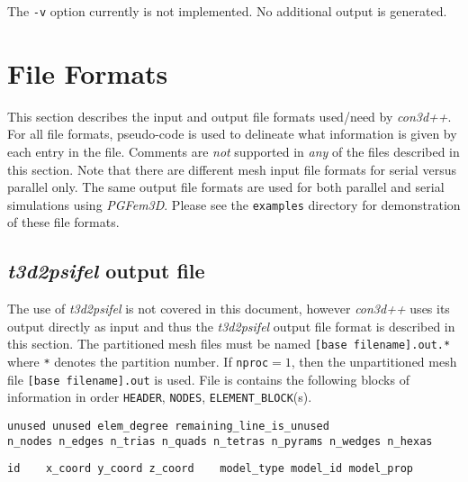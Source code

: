 \documentclass[]{article}
\def\pgf{\emph{PGFem3D}}
\def\con{\emph{con3d++}}
\def\gap{\vspace*{5mm}}
\begin{document}
The \verb=-v= option currently is not implemented. No additional
output is generated.

\section{File Formats}\label{sec:format}
This section describes the input and output file formats used/need by
\con{}. For all file formats, pseudo-code is used to delineate what
information is given by each entry in the file. Comments are
\emph{not} supported in \emph{any} of the files described in this
section. Note that there are different mesh input file formats for
serial versus parallel only. The same output file formats are used for
both parallel and serial simulations using \pgf{}. Please see the
\verb=examples= directory for demonstration of these file formats.
\subsection{\emph{t3d2psifel} output file}\label{sec:format:t3d2psifel}
The use of \emph{t3d2psifel} is not covered in this document, however
\con{} uses its output directly as input and thus the
\emph{t3d2psifel} output file format is described in this section. The
partitioned mesh files must be named \verb=[base filename].out.*=
where \verb=*= denotes the partition number. If \verb=nproc=$=1$, then
the unpartitioned mesh file \verb=[base filename].out= is used. File
is contains the following blocks of information in order
\verb=HEADER=, \verb=NODES=, \verb=ELEMENT_BLOCK=(s).

\gap
{}
\begin{center}
  \begin{minipage}{0.9\textwidth}
    \begin{lstlisting}
unused unused elem_degree remaining_line_is_unused
n_nodes n_edges n_trias n_quads n_tetras n_pyrams n_wedges n_hexas
    \end{lstlisting}
  \end{minipage}
\end{center}

\gap
{}
\begin{center}
  \begin{minipage}{0.9\textwidth}
    \begin{lstlisting}
id    x_coord y_coord z_coord    model_type model_id model_prop
    \end{lstlisting}
  \end{minipage}
\end{center}
\end{document}
